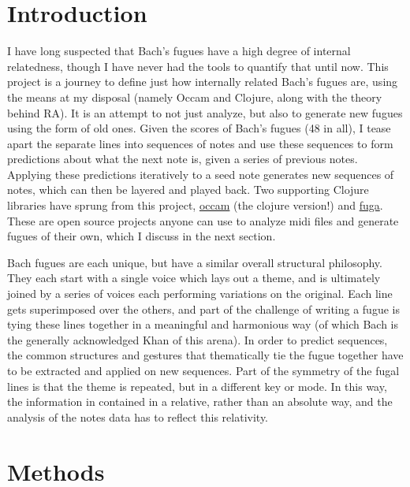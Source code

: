 \documentclass[11pt]{article}
\begin{document}
\maketitle

\section{Introduction}

I have long suspected that Bach's fugues have a high degree of internal relatedness, though I have never had the tools to quantify that until now.  This project is a journey to define just how internally related Bach's fugues are, using the means at my disposal (namely Occam and Clojure, along with the theory behind RA).  It is an attempt to not just analyze, but also to generate new fugues using the form of old ones.  Given the scores of Bach's fugues (48 in all), I tease apart the separate lines into sequences of notes and use these sequences to form predictions about what the next note is, given a series of previous notes.  Applying these predictions iteratively to a seed note generates new sequences of notes, which can then be layered and played back.  Two supporting Clojure libraries have sprung from this project, \href{http://github.com/prismofeverything/occam}{occam} (the clojure version!) and \href{http://github.com/prismofeverything/fuga}{fuga}.  These are open source projects anyone can use to analyze midi files and generate fugues of their own, which I discuss in the next section.  

Bach fugues are each unique, but have a similar overall structural philosophy.  They each start with a single voice which lays out a theme, and is ultimately joined by a series of voices each performing variations on the original.  Each line gets superimposed over the others, and part of the challenge of writing a fugue is tying these lines together in a meaningful and harmonious way (of which Bach is the generally acknowledged Khan of this arena).  In order to predict sequences, the common structures and gestures that thematically tie the fugue together have to be extracted and applied on new sequences.  Part of the symmetry of the fugal lines is that the theme is repeated, but in a different key or mode.  In this way, the information in contained in a relative, rather than an absolute way, and the analysis of the notes data has to reflect this relativity.

\section{Methods}
\end{document}
